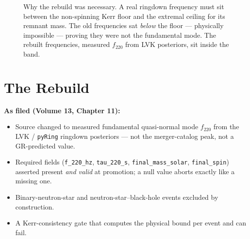 \documentclass[11pt, letterpaper, openany]{book}
\begin{document}
\begin{figure}[H]
\centering
{}
\caption{Why the rebuild was necessary. A real ringdown frequency must sit between the
non-spinning Kerr floor and the extremal ceiling for its remnant mass. The old frequencies sat
\emph{below} the floor --- physically impossible --- proving they were not the fundamental mode.
The rebuilt frequencies, measured $f_{220}$ from LVK posteriors, sit inside the band.}
\end{figure}

\section{The Rebuild}

\begin{predictionbox}
\textbf{As filed (Volume 13, Chapter 11):}
\begin{itemize}
    \item Source changed to measured fundamental quasi-normal mode $f_{220}$ from the LVK /
          \texttt{pyRing} ringdown posteriors --- not the merger-catalog peak, not a
          GR-predicted value.
    \item Required fields (\texttt{f\_220\_hz}, \texttt{tau\_220\_s},
          \texttt{final\_mass\_solar}, \texttt{final\_spin}) asserted present \emph{and valid}
          at promotion; a null value aborts exactly like a missing one.
    \item Binary-neutron-star and neutron-star--black-hole events excluded by construction.
    \item A Kerr-consistency gate that computes the physical bound per event and can fail.
\end{itemize}
\end{predictionbox}
\end{document}
